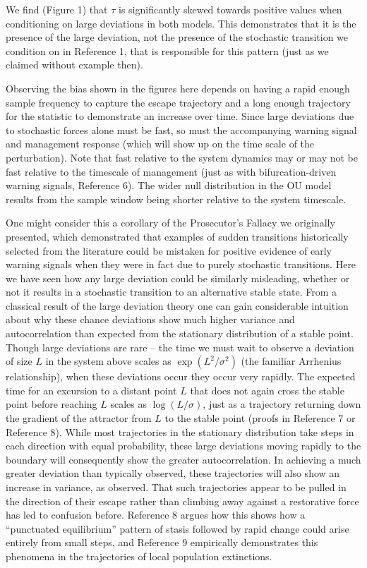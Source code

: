 \documentclass{article}
\begin{document}
We find (Figure 1) that $\tau$ is significantly skewed towards positive
values when conditioning on large deviations in both models. This
demonstrates that it is the presence of the large deviation, not the
presence of the stochastic transition we condition on in Reference 1,
that is responsible for this pattern (just as we claimed without example
then).

Observing the bias shown in the figures here depends on having a rapid
enough sample frequency to capture the escape trajectory and a long
enough trajectory for the statistic to demonstrate an increase over
time. Since large deviations due to stochastic forces alone must be
fast, so must the accompanying warning signal and management response
(which will show up on the time scale of the perturbation). Note that
fast relative to the system dynamics may or may not be fast relative to
the timescale of management (just as with bifurcation-driven warning
signals, Reference 6). The wider null distribution in the OU model
results from the sample window being shorter relative to the system
timescale.

One might consider this a corollary of the Prosecutor's Fallacy we
originally presented, which demonstrated that examples of sudden
transitions historically selected from the literature could be mistaken
for positive evidence of early warning signals when they were in fact
due to purely stochastic transitions. Here we have seen how any large
deviation could be similarly misleading, whether or not it results in a
stochastic transition to an alternative stable state. From a classical
result of the large deviation theory one can gain considerable intuition
about why these chance deviations show much higher variance and
autocorrelation than expected from the stationary distribution of a
stable point. Though large deviations are rare -- the time we must wait
to observe a deviation of size $L$ in the system above scales as
$\exp\left(L^2/\sigma^2\right)$ (the familiar Arrhenius relationship),
when these deviations occur they occur very rapidly. The expected time
for an excursion to a distant point $L$ that does not again cross the
stable point before reaching $L$ scales as $\log(L/\sigma)$, just as a
trajectory returning down the gradient of the attractor from $L$ to the
stable point (proofs in Reference 7 or Reference 8). While most
trajectories in the stationary distribution take steps in each direction
with equal probability, these large deviations moving rapidly to the
boundary will consequently show the greater autocorrelation. In
achieving a much greater deviation than typically observed, these
trajectories will also show an increase in variance, as observed. That
such trajectories appear to be pulled in the direction of their escape
rather than climbing away against a restorative force has led to
confusion before. Reference 8 argues how this shows how a ``punctuated
equilibrium'' pattern of stasis followed by rapid change could arise
entirely from small steps, and Reference 9 empirically demonstrates this
phenomena in the trajectories of local population extinctions.
\end{document}
